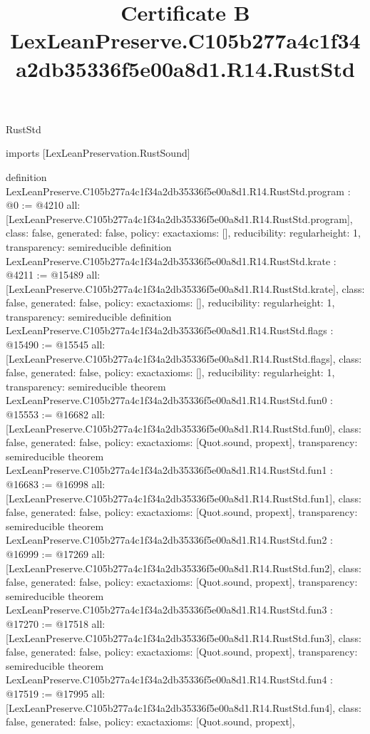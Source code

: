 \begin{lexlean}{RustStd}
\title{Certificate B LexLeanPreserve.C105b277a4c1f34a2db35336f5e00a8d1.R14.RustStd}
\begin{coremodule}
imports [LexLeanPreservation.RustSound]

definition LexLeanPreserve.C105b277a4c1f34a2db35336f5e00a8d1.R14.RustStd.program : @0 := @4210 {
  all: [LexLeanPreserve.C105b277a4c1f34a2db35336f5e00a8d1.R14.RustStd.program],
  class: false,
  generated: false,
  policy: exact{axioms: []},
  reducibility: regular{height: 1},
  transparency: semireducible
}
definition LexLeanPreserve.C105b277a4c1f34a2db35336f5e00a8d1.R14.RustStd.krate : @4211 := @15489 {
  all: [LexLeanPreserve.C105b277a4c1f34a2db35336f5e00a8d1.R14.RustStd.krate],
  class: false,
  generated: false,
  policy: exact{axioms: []},
  reducibility: regular{height: 1},
  transparency: semireducible
}
definition LexLeanPreserve.C105b277a4c1f34a2db35336f5e00a8d1.R14.RustStd.flags : @15490 := @15545 {
  all: [LexLeanPreserve.C105b277a4c1f34a2db35336f5e00a8d1.R14.RustStd.flags],
  class: false,
  generated: false,
  policy: exact{axioms: []},
  reducibility: regular{height: 1},
  transparency: semireducible
}
theorem LexLeanPreserve.C105b277a4c1f34a2db35336f5e00a8d1.R14.RustStd.fun0 : @15553 := @16682 {
  all: [LexLeanPreserve.C105b277a4c1f34a2db35336f5e00a8d1.R14.RustStd.fun0],
  class: false,
  generated: false,
  policy: exact{axioms: [Quot.sound, propext]},
  transparency: semireducible
}
theorem LexLeanPreserve.C105b277a4c1f34a2db35336f5e00a8d1.R14.RustStd.fun1 : @16683 := @16998 {
  all: [LexLeanPreserve.C105b277a4c1f34a2db35336f5e00a8d1.R14.RustStd.fun1],
  class: false,
  generated: false,
  policy: exact{axioms: [Quot.sound, propext]},
  transparency: semireducible
}
theorem LexLeanPreserve.C105b277a4c1f34a2db35336f5e00a8d1.R14.RustStd.fun2 : @16999 := @17269 {
  all: [LexLeanPreserve.C105b277a4c1f34a2db35336f5e00a8d1.R14.RustStd.fun2],
  class: false,
  generated: false,
  policy: exact{axioms: [Quot.sound, propext]},
  transparency: semireducible
}
theorem LexLeanPreserve.C105b277a4c1f34a2db35336f5e00a8d1.R14.RustStd.fun3 : @17270 := @17518 {
  all: [LexLeanPreserve.C105b277a4c1f34a2db35336f5e00a8d1.R14.RustStd.fun3],
  class: false,
  generated: false,
  policy: exact{axioms: [Quot.sound, propext]},
  transparency: semireducible
}
theorem LexLeanPreserve.C105b277a4c1f34a2db35336f5e00a8d1.R14.RustStd.fun4 : @17519 := @17995 {
  all: [LexLeanPreserve.C105b277a4c1f34a2db35336f5e00a8d1.R14.RustStd.fun4],
  class: false,
  generated: false,
  policy: exact{axioms: [Quot.sound, propext]},
}
\end{coremodule}
\end{lexlean}
